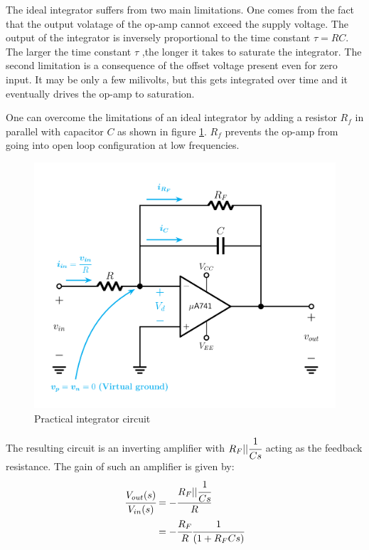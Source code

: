 \documentclass[12pt, titlepage]{article}
\theoremstyle{definition}
\begin{document}
    The ideal integrator suffers from two main limitations. One comes from the fact that the output volatage of the op-amp cannot exceed the supply voltage.
    The output of the integrator is inversely proportional to the time constant $\tau = RC$.
    The larger the time constant $\tau$ ,the longer it takes to saturate the integrator.
    The second limitation is a consequence of the offset voltage present even for zero input.
    It may be only a few milivolts, but this gets integrated over time and it eventually drives the op-amp to saturation.

    One can overcome the limitations of an ideal integrator by adding a resistor $R_{f}$ in parallel with capacitor $C$ as shown in figure \ref{fig:theoretical_practical_integrator}. $R_{f}$ prevents the op-amp from going into open loop configuration at low frequencies.

    \begin{figure}[h]
      \centering
      \includegraphics[scale=0.23]{images/practical_integrator.png}
      \caption{Practical integrator circuit}
      \label{fig:theoretical_practical_integrator}
    \end{figure}

    The resulting circuit is an inverting amplifier with $R_F||\cfrac{1}{Cs}$ acting as the feedback resistance.
    The gain of such an amplifier is given by:
    \begin{align*}
      \cfrac{V_{out}(s)}{V_{in}(s)} &= - \cfrac{R_F||\cfrac{1}{Cs}}{R}\\
      &= - \cfrac{R_F}{R} \cfrac{1}{(1 + R_F Cs)}
    \end{align*}
\end{document}
